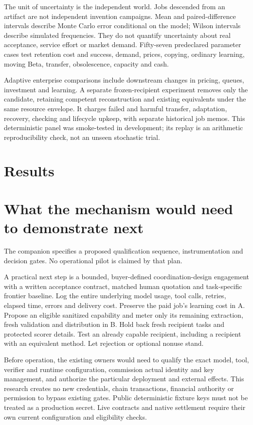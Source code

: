 \documentclass[11pt,letterpaper]{article}
\begin{document}
The unit of uncertainty is the independent world. Jobs descended from an artifact
are not independent invention campaigns. Mean and paired-difference intervals
describe Monte Carlo error conditional on the model; Wilson intervals describe
simulated frequencies. They do not quantify uncertainty about real acceptance,
service effort or market demand. Fifty-seven predeclared parameter cases test
retention cost and success, demand, prices, copying, ordinary learning, moving
Beta, transfer, obsolescence, capacity and cash.

Adaptive enterprise comparisons include downstream changes in pricing, queues,
investment and learning. A separate frozen-recipient experiment removes only
the candidate, retaining competent reconstruction and existing equivalents under
the same resource envelope. It charges failed and harmful transfer, adaptation,
recovery, checking and lifecycle upkeep, with separate historical job memos.
This deterministic panel was smoke-tested in development; its replay is an
arithmetic reproducibility check, not an unseen stochastic trial.

\section{Results}


\section{What the mechanism would need to demonstrate next}

The companion  specifies a proposed
qualification sequence, instrumentation and decision gates. No operational pilot
is claimed by that plan.

A practical next step is a bounded, buyer-defined coordination-design engagement
with a written acceptance contract, matched human quotation and task-specific
frontier baseline. Log the entire underlying model usage, tool calls, retries,
elapsed time, errors and delivery cost. Preserve the paid job's learning cost
in A. Propose an eligible sanitized capability and meter only its remaining
extraction, fresh validation and distribution in B. Hold back fresh recipient
tasks and protected scorer details. Test an already capable recipient, including
a recipient with an equivalent method. Let rejection or optional nonuse stand.

Before operation, the existing owners would need to qualify the exact model,
tool, verifier and runtime configuration, commission actual identity and key
management, and authorize the particular deployment and external effects.
This research creates no new credentials, chain transactions, financial authority
or permission to bypass existing gates. Public deterministic fixture keys must
not be treated as a production secret. Live contracts and native settlement
require their own current configuration and eligibility checks.
\end{document}
